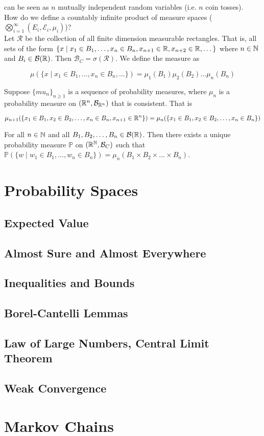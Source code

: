\documentclass[12pt, titlepage]{article}
\begin{document}
can be seen as $n$ mutually independent random variables (i.e. $n$ coin tosses).\\

How do we define a countably infinite product of measure spaces ($\bigotimes_{i = 1}^\infty (E_i, \mathcal{E}_i, \mu_i)$)?\\

Let $\mathcal{R}$ be the collection of all finite dimension measurable rectangles. That is, all sets of the form $\{ x \mid x_1 \in B_1, \dots, x_n \in B_n, x_{n + 1} \in \mathbb{R}, x_{n + 2} \in \mathbb{R}, \dots \}$ where $n \in \mathbb{N}$ and $B_i \in \mathcal{B}(\mathbb{R})$. Then $\mathcal{B}_C = \sigma(\mathcal{R})$. We define the measure as

\[\mu(\{x \mid x_1 \in B_1, \dots, x_n \in B_n, \dots\}) = \mu_1(B_1)\mu_2(B_2)\dots\mu_n(B_n)\] 

\begin{theo}{}
	Suppose $\{mu_n\}_{n \geq 1}$ is a sequence of probability measures, where $\mu_n$ is a probability measure on $(\mathbb{R}^n, \mathcal{B}_{\mathbb{R}^n})$ that is consistent. That is
	
	\[\mu_{n + 1}(\{x_1 \in B_1, x_2 \in B_2, \dots, x_n \in B_n, x_{n+1} \in \mathbb{R}^n\}) = \mu_n(\{x_1 \in B_1, x_2 \in B_2, \dots, x_n \in B_n \})\]
	
	For all $n \in \mathbb{N}$ and all $B_1, B_2, \dots, B_n \in \mathcal{B}(\mathbb{R})$. Then there exists a unique probability measure $\mathbb{P}$ on $(\mathbb{R}^{\mathbb{N}}, \mathcal{B}_C)$ such that $\mathbb{P}(\{w \mid w_1 \in B_1, \dots, w_n \in B_n\}) = \mu_n(B_1 \times B_2 \times \dots \times B_n)$.
\end{theo}

\section{Probability Spaces}

\subsection{Expected Value}

\subsection{Almost Sure and Almost Everywhere}

\subsection{Inequalities and Bounds}

\subsection{Borel-Cantelli Lemmas}

\subsection{Law of Large Numbers, Central Limit Theorem}

\subsection{Weak Convergence}

\section{Markov Chains}
\end{document}
